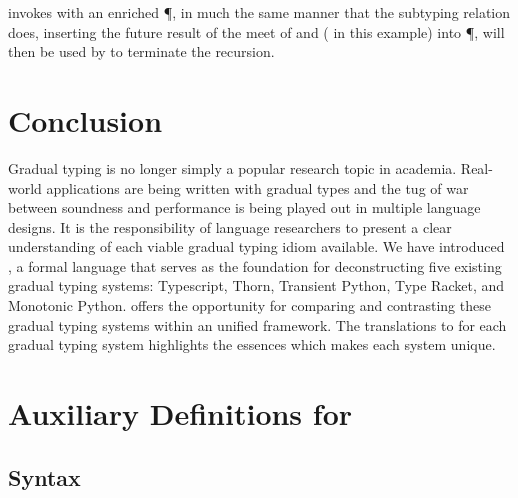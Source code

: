 \documentclass[a4paper,USenglish]{tex/lipics-v2016}
\begin{document}
 invokes  with an enriched \P, in much the same manner
that the subtyping relation does, inserting the future result of the meet of
 and  ( in this example) into \P, will then
be used by  to terminate the recursion.

\section{Conclusion}

Gradual typing is no longer simply a popular research topic in academia.
Real-world applications are being written with gradual types and the tug of
war between soundness and performance is being played out in multiple
language designs.  It is the responsibility of language researchers to
present a clear understanding of each viable gradual typing idiom available.
We have introduced \kafka, a formal language that serves as the foundation
for deconstructing five existing gradual typing systems: Typescript, Thorn,
Transient Python, Type Racket, and Monotonic Python. \kafka offers the
opportunity for comparing and contrasting these gradual typing systems
within an unified framework. The translations to \kafka for each gradual
typing system highlights the essences which makes each system unique.





\clearpage

\appendix
\section{Auxiliary Definitions for \kafka}%
\label{appendix:kafka}


\subsection{Syntax}
\end{document}
